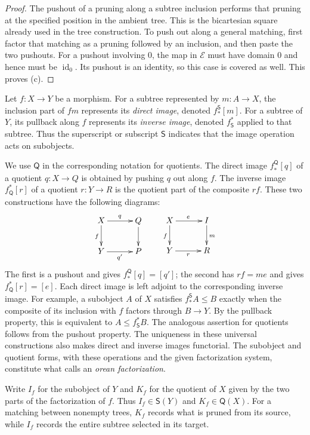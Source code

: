 \documentclass[11pt,a4paper]{article}
\theoremstyle{plain}
\theoremstyle{definition}
\theoremstyle{remark}
\newcommand{\id}{\operatorname{id}}
\begin{document}
\begin{proof}
The pushout of a pruning along a subtree inclusion performs that
pruning at the specified position in the ambient tree. This is
the bicartesian square already used in the tree construction.
To push out along a general matching, first factor that matching
as a pruning followed by an inclusion, and then paste the two
pushouts. For a pushout involving $0$, the map in $\mathcal E$
must have domain $0$ and hence must be $\id_0$. Its pushout
is an identity, so this case is covered as well. This proves (c).
\end{proof}

\label{not:subobject-quotient-images}
Let $f:X\to Y$ be a morphism. For a subtree represented by
$m:A\to X$, the inclusion part of $fm$ represents its
\emph{direct image}, denoted $f_*^{\mathsf S}[m]$. For a
subtree of $Y$, its pullback along $f$ represents its
\emph{inverse image}, denoted $f_{\mathsf S}^*$ applied to
that subtree. Thus the superscript or subscript $\mathsf S$
indicates that the image operation acts on subobjects.

We use $\mathsf Q$ in the corresponding notation for quotients.
The direct image $f_*^{\mathsf Q}[q]$ of a quotient
$q:X\to Q$ is obtained by pushing $q$ out along $f$.
The inverse image $f_{\mathsf Q}^*[r]$ of a quotient
$r:Y\to R$ is the quotient part of the composite $rf$.
These two constructions have the following diagrams:
\[
 \xymatrix@C=3em@R=2.3em{
 X\ar[r]^q\ar[d]_f&Q\ar[d]\\
 Y\ar[r]_{q'}&P
 }
 \qquad
 \xymatrix@C=3em@R=2.3em{
 X\ar[r]^e\ar[d]_f&I\ar[d]^m\\
 Y\ar[r]_r&R
 }
\]
The first is a pushout and gives $f_*^{\mathsf Q}[q]=[q']$;
the second has $rf=me$ and gives $f_{\mathsf Q}^*[r]=[e]$.
Each direct image is left adjoint to the corresponding inverse
image. For example, a subobject $A$ of $X$ satisfies
$f_*^{\mathsf S}A\le B$ exactly when the composite of its
inclusion with $f$ factors through $B\to Y$. By the pullback
property, this is equivalent to $A\le f_{\mathsf S}^*B$.
The analogous assertion for quotients follows from the pushout
property. The uniqueness in these universal constructions also
makes direct and inverse images functorial. The subobject and
quotient forms, with these operations and the given factorization
system, constitute
what \cite[Definition 95 and Theorem 100]{JanelidzeVanNiekerk} calls an
\emph{orean factorization}.

\label{not:matching-factor-parts}
Write $I_f$ for the subobject of $Y$ and $K_f$ for the quotient
of $X$ given by the two parts of the factorization of $f$.
Thus $I_f\in\mathsf S(Y)$ and $K_f\in\mathsf Q(X)$.
For a matching between nonempty trees, $K_f$ records what is
pruned from its source, while $I_f$ records the entire subtree
selected in its target.
\end{document}
